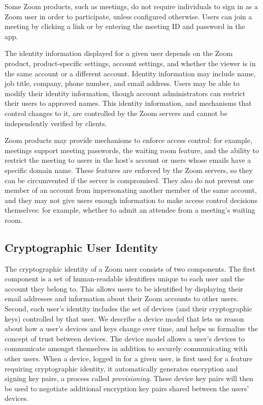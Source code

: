 Some Zoom products, such as meetings, do not require individuals to sign in as a Zoom user in order
to participate, unless configured otherwise. Users can join a meeting by clicking a link or by
entering the meeting ID and password in the app.

The identity information displayed for a given user depends on the Zoom product, product-specific
settings, account settings, and whether the viewer is in the same account or a different account.
Identity information may include name, job title, company, phone number, and email address. Users
may be able to modify their identity information, though account administrators can restrict their
users to approved names. This identity information, and mechanisms that control changes to it, are
controlled by the Zoom servers and cannot be independently verified by clients.



Zoom products may provide mechanisms to enforce access control: for example, meetings support
meeting passwords, the waiting room feature, and the ability to restrict the meeting to users in the
host's account or users whose emails have a specific domain name. These features are enforced by the
Zoom servers, so they can be circumvented if the server is compromised. They also do not prevent one
member of an account from impersonating another member of the same account, and they may not give
users enough information to make access control decisions themselves: for example, whether to admit
an attendee from a meeting's waiting room.

\subsection{Cryptographic User Identity}

The cryptographic identity of a Zoom user consists of two components. The first component is a set
of human-readable identifiers unique to each user and the account they belong to. This allows users
to be identified by displaying their email addresses and information about their Zoom accounts to
other users. Second, each user's identity includes the set of devices (and their cryptographic keys)
controlled by that user. We describe a device model that lets us reason about how a user's devices
and keys change over time, and helps us formalize the concept of trust between devices. The device
model allows a user's devices to communicate amongst themselves in addition to securely
communicating with other users. When a device, logged in for a given user, is first used for a
feature requiring cryptographic identity, it automatically generates encryption and signing key
pairs, a process called \textit{provisioning}. These device key pairs will then be used to negotiate
additional encryption key pairs shared between the users' devices.

